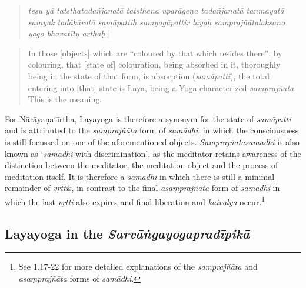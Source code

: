 \begin{quote}
\textit{teṣu yā tatsthatadañjanatā tatsthena uparāgeṇa tadañjanatā tanmayatā samyak tadākāratā samāpattiḥ samyagāpattir layaḥ samprajñātalakṣaṇo yogo bhavatīty arthaḥ} |
\end{quote}
\begin{quote}
In those [objects] which are ``coloured by that which resides there'', by colouring, that [state of] colouration, being absorbed in it, thoroughly being in the state of that form, is absorption (\textit{samāpatti}), the total entering into [that] state is Laya, being a Yoga characterized \textit{samprajñāta}. This is the meaning.
\end{quote}

For Nārāyaṇatīrtha, Layayoga is therefore a synonym for the state of \textit{samāpatti} and is attributed to the \textit{samprajñāta} form of \textit{samādhi}, in which the consciousness is still focussed on one of the aforementioned objects. \textit{Samprajñātasamādhi} is also known as `\textit{samādhi} with discrimination', as the meditator retains awareness of the distinction between the meditator, the meditation object and the process of meditation itself. It is therefore a \textit{samādhi} in which there is still a minimal remainder of \textit{vṛtti}s, in contrast to the final \textit{asaṃprajñāta} form of \textit{samādhi} in which the last \textit{vṛtti} also expires and final liberation and \textit{kaivalya} occur.\footnote{See  1.17-22 for more detailed explanations of the \textit{samprajñāta} and \textit{asaṃprajñāta} forms of \textit{samādhi}.}

\subsection{Layayoga in the \textit{Sarvāṅgayogapradīpikā}}

